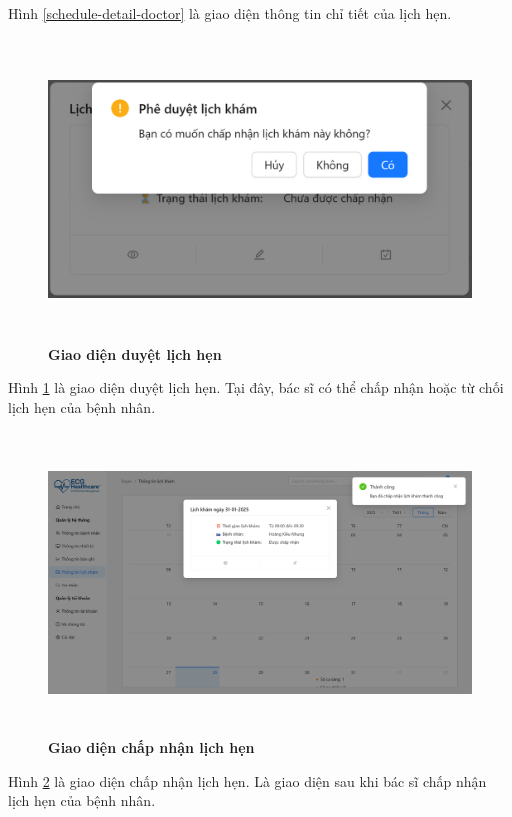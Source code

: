 Hình \ref{schedule-detail-doctor} là giao diện thông tin chỉ tiết của lịch hẹn.

\begin{figure}[H]
	\centering
	\includegraphics[width=15cm,height=8cm]{Images/doctor_ui/review.png}
	\caption[Giao diện duyệt lịch hẹn]{\bfseries \fontsize{12pt}{0pt}\selectfont Giao diện duyệt lịch hẹn}
	\label{review}
\end{figure}

Hình \ref{review} là giao diện duyệt lịch hẹn. Tại đây, bác sĩ có thể chấp nhận hoặc từ chối lịch hẹn của bệnh nhân.

\begin{figure}[H]
	\centering
	\includegraphics[width=15cm,height=8cm]{Images/doctor_ui/accepted.png}
	\caption[Giao diện chấp nhận lịch hẹn]{\bfseries \fontsize{12pt}{0pt}\selectfont Giao diện chấp nhận lịch hẹn}
	\label{accepted}
\end{figure}

Hình \ref{accepted} là giao diện chấp nhận lịch hẹn. Là giao diện sau khi bác sĩ chấp nhận lịch hẹn của bệnh nhân.


